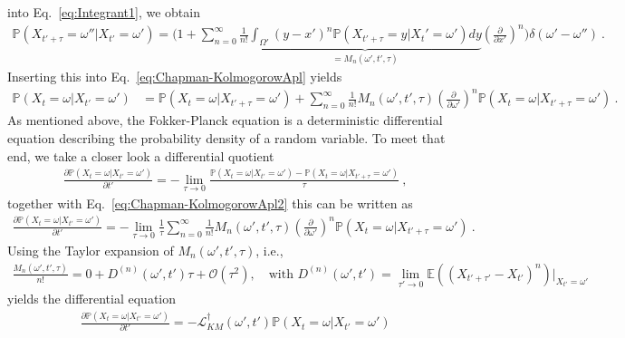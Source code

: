 \documentclass[11pt,a4paper]{article}
\numberwithin{equation}{section}
\begin{document}
into Eq.~\eqref{eq:Integrant1}, we obtain
\begin{align*}
\mathbb{P}(X_{t'+\tau}=\omega''|X_{t'}=\omega')
=
\Bigg(
1+\sum_{n=0}^{\infty}\frac{1}{n!}
\underbrace{\int_{\Omega'}(y-x')^n\mathbb{P}(X_{t'+\tau}=y|X_t'=\omega')dy}_{=M_n(\omega',t',\tau)}\left( \frac{\partial}{\partial x'} \right)^n
\Bigg)\delta(\omega'-\omega'')~.
\end{align*}
Inserting this into Eq.~\eqref{eq:Chapman-KolmogorowApl} yields
\begin{align*}
\label{eq:Chapman-KolmogorowApl2}
\mathbb{P}(X_{t}=\omega|X_{t'}=\omega')
&=
\mathbb{P}(X_{t}=\omega|X_{t'+\tau}=\omega')
+\sum_{n=0}^{\infty}\frac{1}{n!}M_n(\omega',t',\tau)\left( \frac{\partial}{\partial \omega'} \right)^n
\mathbb{P}(X_{t}=\omega|X_{t'+\tau}=\omega')~.
\end{align*}
As mentioned above, the Fokker-Planck equation is a deterministic differential equation describing the probability density of a random variable. To meet that end, we take a closer look a differential quotient
\begin{align*}
\frac{\partial \mathbb{P}(X_{t}=\omega|X_{t'}=\omega')}{\partial t'}
=
-\lim_{\tau\to 0} \frac{\mathbb{P}(X_{t}=\omega|X_{t'}=\omega')-\mathbb{P}(X_{t}=\omega|X_{t'+\tau}=\omega')}{\tau}~,
\end{align*}
together with Eq.~\eqref{eq:Chapman-KolmogorowApl2} this can be written as
\begin{align*}
\frac{\partial \mathbb{P}(X_{t}=\omega|X_{t'}=\omega')}{\partial t'}
=
-\lim_{\tau\to 0} \frac{1}{\tau}\sum_{n=0}^{\infty}\frac{1}{n!}M_n(\omega',t',\tau)\left( \frac{\partial}{\partial \omega'} \right)^n
\mathbb{P}(X_{t}=\omega|X_{t'+\tau}=\omega')~.
\end{align*}
Using the Taylor expansion of $M_n(\omega',t',\tau)$, i.e.,
\begin{align*}
\frac{M_n(\omega',t',\tau)}{n!} = 0+D^{(n)}(\omega',t')\tau+\mathcal{O}(\tau^2),\quad\text{with } D^{(n)}(\omega',t') = \lim_{\tau'\to 0}\mathbb{E}((X_{t'+\tau'}-X_{t'})^n)\big|_{X_{t'}=\omega'}
\end{align*}
yields the differential equation
\begin{align}
\label{eq:Fokker-Planck-Prob}
\frac{\partial \mathbb{P}(X_{t}=\omega|X_{t'}=\omega')}{\partial t'}
=
-\mathcal{L}_{KM}^{\dagger}(\omega',t')\mathbb{P}(X_{t}=\omega|X_{t'}=\omega')
\end{align}
\end{document}
